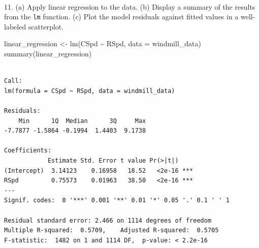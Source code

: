 \documentclass[
  letterpaper,
  DIV=11,
  numbers=noendperiod]{scrartcl}
\makeatletter
\let\oldparagraph\paragraph
\renewcommand{\paragraph}{
    \@ifstar
      \xxxParagraphStar
      \xxxParagraphNoStar
  }
\newcommand{\xxxParagraphStar}[1]{\oldparagraph*{#1}\mbox{}}
\newcommand{\xxxParagraphNoStar}[1]{\oldparagraph{#1}\mbox{}}
\newenvironment{Shaded}{\begin{snugshade}}{\end{snugshade}}
\newcommand{\AttributeTok}[1]{\textcolor[rgb]{0.40,0.45,0.13}{#1}}
\newcommand{\FunctionTok}[1]{\textcolor[rgb]{0.28,0.35,0.67}{#1}}
\newcommand{\NormalTok}[1]{\textcolor[rgb]{0.00,0.23,0.31}{#1}}
\newcommand{\OtherTok}[1]{\textcolor[rgb]{0.00,0.23,0.31}{#1}}
\newcommand{\SpecialCharTok}[1]{\textcolor[rgb]{0.37,0.37,0.37}{#1}}
\makeatother
\begin{document}
\paragraph{\texorpdfstring{11. (a) Apply linear regression to the data.
(b) Display a summary of the results from the \texttt{lm} function. (c)
Plot the model residuals against fitted values in a well-labeled
scatterplot.}{11. (a) Apply linear regression to the data. (b) Display a summary of the results from the lm function. (c) Plot the model residuals against fitted values in a well-labeled scatterplot.}}\label{a-apply-linear-regression-to-the-data.-b-display-a-summary-of-the-results-from-the-lm-function.-c-plot-the-model-residuals-against-fitted-values-in-a-well-labeled-scatterplot.}

\begin{Shaded}
\begin{Highlighting}[]
\NormalTok{linear\_regression }\OtherTok{\textless{}{-}} \FunctionTok{lm}\NormalTok{(CSpd }\SpecialCharTok{\textasciitilde{}}\NormalTok{ RSpd, }\AttributeTok{data =}\NormalTok{ windmill\_data)}
\FunctionTok{summary}\NormalTok{(linear\_regression)}
\end{Highlighting}
\end{Shaded}

\begin{verbatim}

Call:
lm(formula = CSpd ~ RSpd, data = windmill_data)

Residuals:
    Min      1Q  Median      3Q     Max 
-7.7877 -1.5864 -0.1994  1.4403  9.1738 

Coefficients:
            Estimate Std. Error t value Pr(>|t|)    
(Intercept)  3.14123    0.16958   18.52   <2e-16 ***
RSpd         0.75573    0.01963   38.50   <2e-16 ***
---
Signif. codes:  0 '***' 0.001 '**' 0.01 '*' 0.05 '.' 0.1 ' ' 1

Residual standard error: 2.466 on 1114 degrees of freedom
Multiple R-squared:  0.5709,    Adjusted R-squared:  0.5705 
F-statistic:  1482 on 1 and 1114 DF,  p-value: < 2.2e-16
\end{verbatim}
\end{document}
